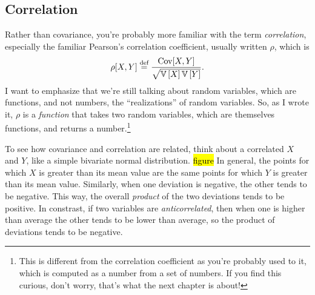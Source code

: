 \subsection{Correlation}

Rather than covariance, you're probably more
familiar with the term \emph{correlation}, especially the familiar Pearson's
correlation coefficient, usually written $\rho$, which is
\begin{equation}
\rho[X, Y] \stackrel{\text{def}}{=} \frac{\mathrm{Cov}\!\left[{X, Y}\right]}{\sqrt{\mathbb{V}\left[{X}\right] \mathbb{V}\left[{Y}\right]}}.
\end{equation}
I want to emphasize that we're still talking about random variables, which are
functions, and not numbers, the ``realizations'' of random variables. So, as I
wrote it, $\rho$ is a \emph{function} that takes two random variables, which
are themselves functions, and returns a number.\footnote{This is different
from the correlation coefficient as you're probably used to it, which is
computed as a number from a set of numbers. If you find this curious, don't
worry, that's what the next chapter is about!}

To see how covariance and correlation are related, think about a correlated
$X$ and $Y$, like a simple bivariate normal distribution. \hl{figure} In
general, the points for which $X$ is greater than its mean value are the same
points for which $Y$ is greater than its mean value. Similarly, when one
deviation is negative, the other tends to be negative. This way, the overall
\emph{product} of the two deviations tends to be positive. In constrast, if
two variables are \emph{anticorrelated}, then when one is higher than average
the other tends to be lower than average, so the product of deviations tends
to be negative.

